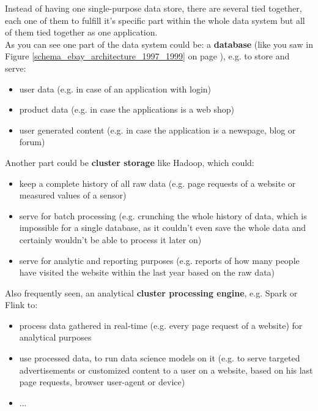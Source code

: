 Instead of having one single-purpose data store, there are several tied together, each one of them to fulfill it's specific part within the whole data system but all of them tied together as one application. \\
As you can see one part of the data system could be: a \textbf{database} (like you saw in Figure \ref{schema_ebay_architecture_1997_1999} on page \pageref{schema_ebay_architecture_1997_1999}), e.g. to store and serve:\\
\begin{itemize}
	\item user data (e.g. in case of an application with login)
	\item product data (e.g. in case the applications is a web shop)
	\item user generated content  (e.g. in case the application is a newspage, blog or forum)\\
\end{itemize}
Another part could be \textbf{cluster storage} like Hadoop, which could:\\
\begin{itemize}
	\item keep a complete history of all raw data (e.g. page requests of a website or measured values of a sensor)
	\item serve for batch processing (e.g. crunching the whole history of data, which is impossible for a single database, as it couldn't even save the whole data and certainly wouldn't be able to process it later on)
	\item serve for analytic and reporting purposes (e.g. reports of how many people have visited the website within the last year based on the raw data)\\
\end{itemize}
Also frequently seen, an analytical \textbf{cluster processing engine}, e.g. Spark or Flink to:\\
\begin{itemize}
	\item process data gathered in real-time (e.g. every page request of a website) for analytical purposes
	\item use processed data, to run data science models on it (e.g. to serve targeted advertisements or customized content to a user on a website, based on his last page requests, browser user-agent or device)
	\item ...\\
\end{itemize}
